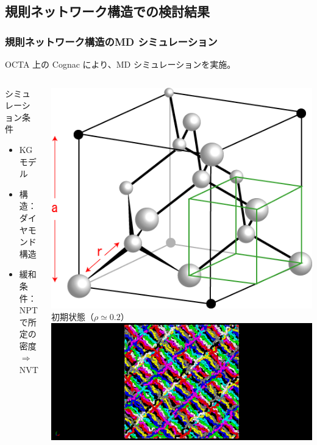 \documentclass[11pt, dvipdfmx]{beamer}
\begin{document}
\subsection{規則ネットワーク構造での検討結果}
\begin{frame}
\frametitle{規則ネットワーク構造のMD シミュレーション}
OCTA 上の Cognac により、MD シミュレーションを実施。
\begin{columns}[T, totalwidth=1\linewidth]
\begin{block}{\large シミュレーション条件}
	\begin{itemize}
	\item
	KG モデル
	\item
	構造：ダイヤモンド構造
	\item
	緩和条件：\\
	NPTで所定の密度 $\Rightarrow$ NVT
	\end{itemize} 
\end{block}
\vspace{5mm}
\centering
\includegraphics[width=0.6\columnwidth]{./fig/dia_green_2.png}
初期状態（$\rho \simeq 0.2$）
\includegraphics[width=\columnwidth]{./fig/Init.png}
\vspace{-3mm}

\end{columns}
\end{frame}
\end{document}
